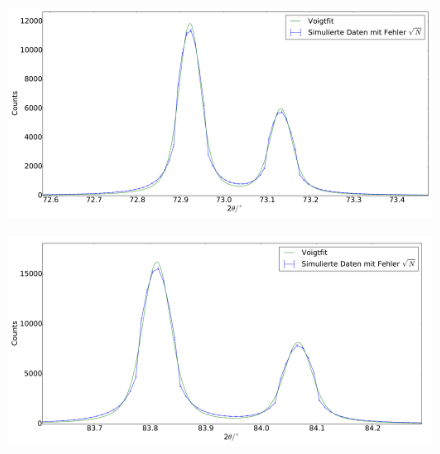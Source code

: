 \begin{figure}[H]
\begin{minipage}{.5\textwidth}
  \centering
  \includegraphics[scale=0.15]{Simulation_Germaniumpulver_5}
  \label{fig:pul_sim_ger_5}
\end{minipage}
\hspace{0.5cm}
\begin{minipage}{.5\textwidth}
  \centering
  \includegraphics[scale=0.15]{Simulation_Germaniumpulver_6}
  \label{fig:pul_sim_ger_6}
\end{minipage}
\end{figure}
